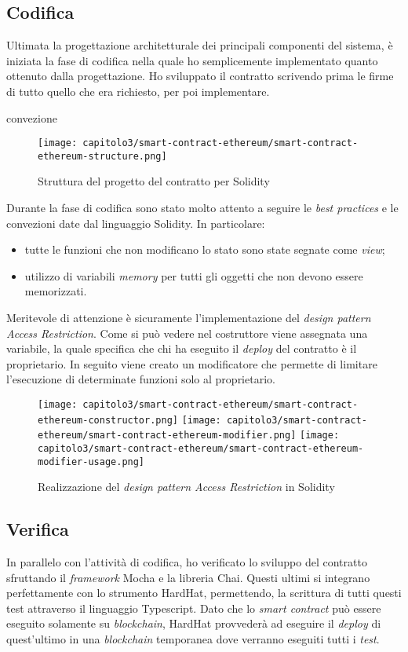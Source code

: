 \subsection{Codifica}
Ultimata la progettazione architetturale dei principali componenti del sistema, è iniziata la fase di codifica nella quale ho semplicemente implementato quanto ottenuto dalla progettazione. Ho sviluppato il contratto scrivendo prima le firme di tutto quello che era richiesto, per poi implementare.

\clearpage
convezione
\begin{figure}[h!]
  \centering
  \texttt{[image: capitolo3/smart-contract-ethereum/smart-contract-ethereum-structure.png]}
  \caption{Struttura del progetto del contratto per Solidity}
\end{figure}

Durante la fase di codifica sono stato molto attento a seguire le \textit{best practices} e le convezioni date dal linguaggio Solidity. In particolare:
\begin{itemize}
  \item tutte le funzioni che non modificano lo stato sono state segnate come \textit{view};
  \item utilizzo di variabili \textit{memory} per tutti gli oggetti che non devono essere memorizzati.
\end{itemize}

Meritevole di attenzione è sicuramente l'implementazione del \textit{design pattern Access Restriction}. Come si può vedere nel costruttore viene assegnata una variabile, la quale specifica che chi ha eseguito il \textit{deploy} del contratto è il proprietario. In seguito viene creato un modificatore che permette di limitare l'esecuzione di determinate funzioni solo al proprietario.

\begin{figure}[h!]
  \centering
  \texttt{[image: capitolo3/smart-contract-ethereum/smart-contract-ethereum-constructor.png]}
  \texttt{[image: capitolo3/smart-contract-ethereum/smart-contract-ethereum-modifier.png]}
  \texttt{[image: capitolo3/smart-contract-ethereum/smart-contract-ethereum-modifier-usage.png]}
  \caption{Realizzazione del \textit{design pattern Access Restriction} in Solidity}
\end{figure}

\subsection{Verifica}
In parallelo con l'attività di codifica, ho verificato lo sviluppo del contratto sfruttando il \textit{framework} Mocha e la libreria Chai. Questi ultimi si integrano perfettamente con lo strumento HardHat, permettendo, la scrittura di tutti questi test attraverso il linguaggio Typescript. Dato che lo \textit{smart contract} può essere eseguito solamente su \textit{blockchain}, HardHat provvederà ad eseguire il \textit{deploy} di quest'ultimo in una \textit{blockchain} temporanea dove verranno eseguiti tutti i \textit{test}. 


